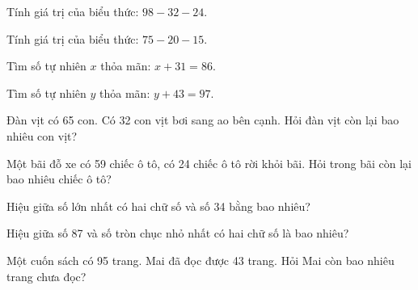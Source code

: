 \begin{ex}
Tính giá trị của biểu thức: $98 - 32 - 24$.
\end{ex}

\begin{ex}
Tính giá trị của biểu thức: $75 - 20 - 15$.
\end{ex}

\begin{ex}
Tìm số tự nhiên $x$ thỏa mãn: $x + 31 = 86$.
\end{ex}

\begin{ex}
Tìm số tự nhiên $y$ thỏa mãn: $y + 43 = 97$.
\end{ex}

\begin{ex}
Đàn vịt có 65 con. Có 32 con vịt bơi sang ao bên cạnh. Hỏi đàn vịt còn lại bao nhiêu con vịt?
\end{ex}

\begin{ex}
Một bãi đỗ xe có 59 chiếc ô tô, có 24 chiếc ô tô rời khỏi bãi. Hỏi trong bãi còn lại bao nhiêu chiếc ô tô?
\end{ex}

\begin{ex}
Hiệu giữa số lớn nhất có hai chữ số và số 34 bằng bao nhiêu?
\end{ex}

\begin{ex}
Hiệu giữa số 87 và số tròn chục nhỏ nhất có hai chữ số là bao nhiêu?
\end{ex}

\begin{ex}
Một cuốn sách có 95 trang. Mai đã đọc được 43 trang. Hỏi Mai còn bao nhiêu trang chưa đọc?
\end{ex}


